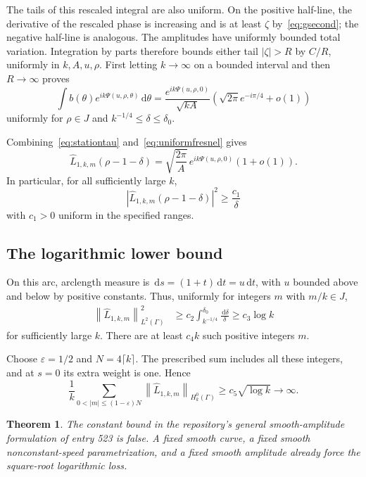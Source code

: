 \documentclass[11pt,a4paper]{article}
\newtheorem{theorem}{Theorem}[section]
\theoremstyle{remark}
\newcommand{\eps}{\varepsilon}
\newcommand{\norm}[1]{\left\lVert #1\right\rVert}
\newcommand{\abs}[1]{\left\lvert #1\right\rvert}
\newcommand{\dd}{\,\mathrm d}
\begin{document}
The tails of this rescaled integral are also uniform. On the positive half-line, the derivative of the rescaled phase is increasing and is at least $\zeta$ by~\eqref{eq:gsecond}; the negative half-line is analogous. The amplitudes have uniformly bounded total variation. Integration by parts therefore bounds either tail $|\zeta|>R$ by $C/R$, uniformly in $k,A,u,\rho$. First letting $k\to\infty$ on a bounded interval and then $R\to\infty$ proves
\begin{equation}\label{eq:uniformfresnel}
 \int b(\theta)e^{ik\Psi(u,\rho,\theta)}\dd\theta
 =\frac{e^{ik\Psi(u,\rho,0)}}{\sqrt{kA}}
 \left(\sqrt{2\pi}e^{-i\pi/4}+o(1)\right)
\end{equation}
uniformly for $\rho\in J$ and $k^{-1/4}\le\delta\le\delta_0$.

Combining~\eqref{eq:stationtau} and~\eqref{eq:uniformfresnel} gives
\begin{equation}\label{eq:nystromasymp}
 \widehat L_{1,k,m}(\rho-1-\delta)
 =\sqrt{\frac{2\pi}{A}}\,e^{ik\Psi(u,\rho,0)}(1+o(1)).
\end{equation}
In particular, for all sufficiently large $k$,
\[
 \abs{\widehat L_{1,k,m}(\rho-1-\delta)}^2\ge\frac{c_1}{\delta}
\]
with $c_1>0$ uniform in the specified ranges.

\subsection{The logarithmic lower bound}

On this arc, arclength measure is $\dd s=(1+t)\dd t=u\dd t$, with $u$ bounded above and below by positive constants. Thus, uniformly for integers $m$ with $m/k\in J$,
\begin{align}
 \norm{\widehat L_{1,k,m}}_{L^2(\Gamma)}^2
 &\ge c_2\int_{k^{-1/4}}^{\delta_0}\frac{\dd\delta}{\delta}
 \ge c_3\log k
\end{align}
for sufficiently large $k$. There are at least $c_4k$ such positive integers $m$.

Choose $\eps=1/2$ and $N=4\lceil k\rceil$. The prescribed sum includes all these integers, and at $s=0$ its extra weight is one. Hence
\begin{equation}\label{eq:loglower}
 \frac1k\sum_{0<|m|\le(1-\eps)N}
 \norm{\widehat L_{1,k,m}}_{H_k^0(\Gamma)}
 \ge c_5\sqrt{\log k}\longrightarrow\infty.
\end{equation}

\begin{theorem}
The constant bound in the repository's general smooth-amplitude formulation of entry 523 is false. A fixed smooth curve, a fixed smooth nonconstant-speed parametrization, and a fixed smooth amplitude already force the square-root logarithmic loss.
\end{theorem}
\end{document}

